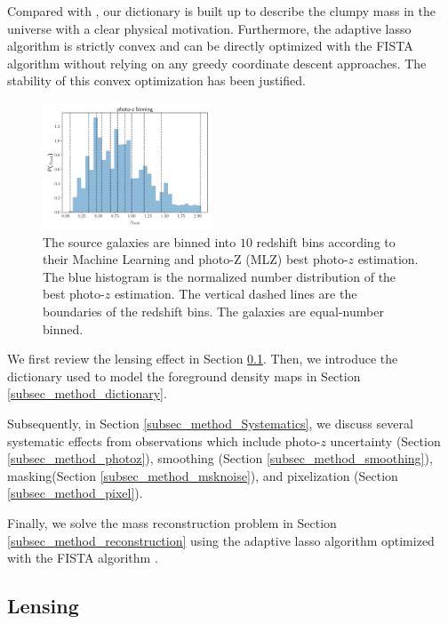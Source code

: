 Compared with \citet{LSS-massMap-Glimpse3D-Leonard2014}, our dictionary is
built up to describe the clumpy mass in the universe with a clear physical
motivation. Furthermore, the adaptive lasso algorithm is strictly convex and
can be directly optimized with the FISTA algorithm \citep{FISTA-Beck2009}
without relying on any greedy coordinate descent approaches. The stability of
this convex optimization has been justified.

\begin{figure}
 \centering
 \includegraphics[width=0.45\textwidth]{photo-z_binning.pdf}
 \caption{The source galaxies are binned into $10$ redshift bins according to
     their Machine Learning and photo-Z (MLZ) best photo-$z$ estimation. The
     blue histogram is the normalized number distribution of the best photo-$z$
     estimation. The vertical dashed lines are the boundaries of the redshift
     bins.  The galaxies are equal-number binned.
    } \label{fig_bestpz}
\end{figure}

We first review the lensing effect in Section \ref{subsec_method_delta2shear}.
Then, we introduce the dictionary used to model the foreground density maps in
Section \ref{subsec_method_dictionary}.

Subsequently, in Section \ref{subsec_method_Systematics}, we discuss several
systematic effects from observations which include photo-$z$ uncertainty
(Section \ref{subsec_method_photoz}), smoothing (Section
\ref{subsec_method_smoothing}), masking(Section \ref{subsec_method_msknoise}),
and pixelization (Section \ref{subsec_method_pixel}).

Finally, we solve the mass reconstruction problem in Section
\ref{subsec_method_reconstruction} using the adaptive lasso algorithm
\citep{AdaLASSO-Zou2006} optimized with the FISTA algorithm
\citep{FISTA-Beck2009}.


\subsection{Lensing}
\label{subsec_method_delta2shear}

